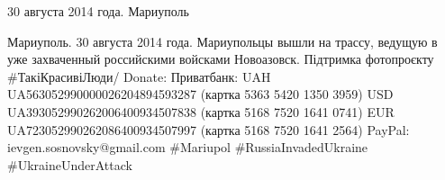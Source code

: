  
 
 
 
 


30 августа 2014 года. Мариуполь

Мариуполь. 30 августа 2014 года. Мариупольцы вышли на трассу, ведущую в уже захваченный российскими войсками Новоазовск. Підтримка фотопроєкту #ТакіКрасивіЛюди/ Donate: Приватбанк: UAH UA563052990000026204894593287 (картка 5363 5420 1350 3959) USD UA393052990262006400934507838 (картка 5168 7520 1641 0741) EUR UA723052990262086400934507997 (картка 5168 7520 1641 2564) PayPal: ievgen.sosnovsky@gmail.com #Mariupol #RussiaInvadedUkraine #UkraineUnderAttack
